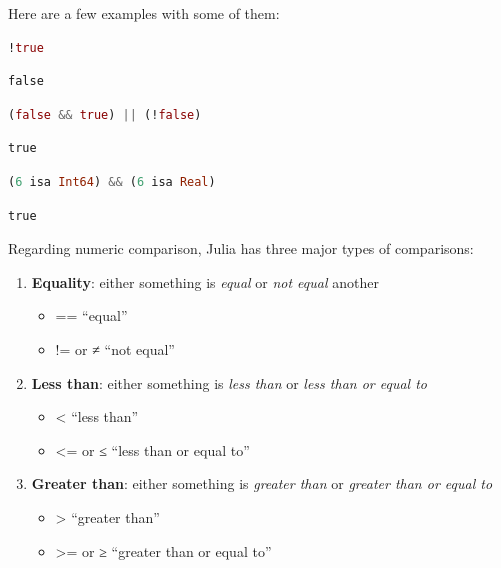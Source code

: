 \documentclass[
  notoc %
]{tufte-book}
\providecommand{\tightlist}{%
  \setlength{\itemsep}{0pt}\setlength{\parskip}{0pt}
}
\begin{document}
Here are a few examples with some of them:

\begin{lstlisting}[language=Julia]
!true
\end{lstlisting}

\begin{lstlisting}[language=Output]
false
\end{lstlisting}

\begin{lstlisting}[language=Julia]
(false && true) || (!false)
\end{lstlisting}

\begin{lstlisting}[language=Output]
true
\end{lstlisting}

\begin{lstlisting}[language=Julia]
(6 isa Int64) && (6 isa Real)
\end{lstlisting}

\begin{lstlisting}[language=Output]
true
\end{lstlisting}

Regarding numeric comparison, Julia has three major types of
comparisons:

\begin{enumerate}
\def\labelenumi{\arabic{enumi}.}
\tightlist
\item
  \textbf{Equality}: either something is \emph{equal} or \emph{not
  equal} another

  \begin{itemize}
  \tightlist
  \item
    == ``equal''
  \item
    != or ≠ ``not equal''
  \end{itemize}
\item
  \textbf{Less than}: either something is \emph{less than} or \emph{less
  than or equal to}

  \begin{itemize}
  \tightlist
  \item
    \textless{} ``less than''
  \item
    \textless= or ≤ ``less than or equal to''
  \end{itemize}
\item
  \textbf{Greater than}: either something is \emph{greater than} or
  \emph{greater than or equal to}

  \begin{itemize}
  \tightlist
  \item
    \textgreater{} ``greater than''
  \item
    \textgreater= or ≥ ``greater than or equal to''
  \end{itemize}
\end{enumerate}
\end{document}
